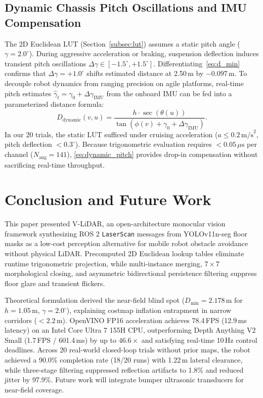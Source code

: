 \documentclass{ieeeaccess}
\begin{document}
\subsection{Dynamic Chassis Pitch Oscillations and IMU Compensation}
\label{subsec:dynamic_pitch}
The 2D Euclidean LUT (Section~\ref{subsec:lut}) assumes a static pitch angle ($\gamma = 2.0^\circ$). During aggressive acceleration or braking, suspension deflection induces transient pitch oscillations $\Delta \gamma \in [-1.5^\circ, +1.5^\circ]$. Differentiating~\eqref{eq:d_min} confirms that $\Delta \gamma = +1.0^\circ$ shifts estimated distance at 2.50\,m by $-0.097$\,m. To decouple robot dynamics from ranging precision on agile platforms, real-time pitch estimates $\hat{\gamma}_t = \gamma_0 + \Delta \gamma_{\mathrm{IMU}}$ from the onboard IMU can be fed into a parameterized distance formula:
\begin{equation}
  D_{\mathrm{dynamic}}(v, u) = \frac{h \cdot \sec(\theta(u))}{\tan(\phi(v) + \gamma_0 + \Delta \gamma_{\mathrm{IMU}})}.
  \label{eq:dynamic_pitch}
\end{equation}
In our 20 trials, the static LUT sufficed under cruising acceleration ($a \le 0.2\,\text{m/s}^2$, pitch deflection $<0.3^\circ$). Because trigonometric evaluation requires $<0.05\,\mu\text{s}$ per channel ($N_{\mathrm{ang}}=141$), \eqref{eq:dynamic_pitch} provides drop-in compensation without sacrificing real-time throughput.

\section{Conclusion and Future Work}
\label{sec:conclusion}

This paper presented V-LiDAR, an open-architecture monocular vision framework synthesizing ROS 2 \texttt{LaserScan} messages from YOLOv11n-seg floor masks as a low-cost perception alternative for mobile robot obstacle avoidance without physical LiDAR. Precomputed 2D Euclidean lookup tables eliminate runtime trigonometric projection, while multi-instance merging, $7 \times 7$ morphological closing, and asymmetric bidirectional persistence filtering suppress floor glare and transient flickers.

Theoretical formulation derived the near-field blind spot ($D_{\min} = 2.178$\,m for $h=1.05$\,m, $\gamma=2.0^\circ$), explaining costmap inflation entrapment in narrow corridors ($<2.2$\,m). OpenVINO FP16 acceleration achieves 78.4\,FPS (12.9\,ms latency) on an Intel Core Ultra 7 155H CPU, outperforming Depth Anything V2 Small (1.7\,FPS / 601.4\,ms) by up to $46.6\times$ and satisfying real-time 10\,Hz control deadlines. Across 20 real-world closed-loop trials without prior maps, the robot achieved a 90.0\% completion rate (18/20 runs) with 1.22\,m lateral clearance, while three-stage filtering suppressed reflection artifacts to 1.8\% and reduced jitter by 97.9\%. Future work will integrate bumper ultrasonic transducers for near-field coverage.
\end{document}
